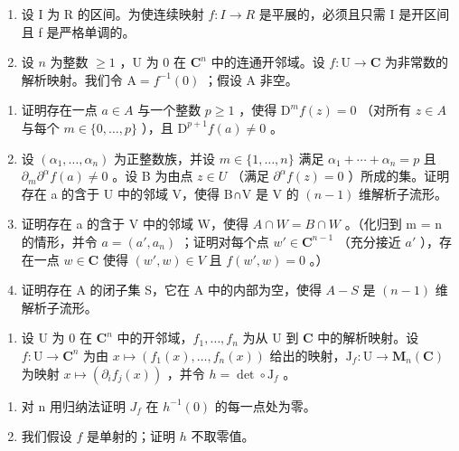 \begin{enumerate}
\def\labelenumi{\arabic{enumi})}
\setcounter{enumi}{2}
\item
  设 I 为 R 的区间。为使连续映射 \(f: I \rightarrow R\) 是平展的，必须且只需 I 是开区间且 f 是严格单调的。
\item
  设 \(n\) 为整数 \(\geqslant 1\) ，U 为 0 在 \(\mathbf{C}^n\) 中的连通开邻域。设 \(f: \mathrm{U} \to \mathbf{C}\) 为非常数的解析映射。我们令 \(\mathrm{A} = f^{-1}(0)\) ；假设 A 非空。
\end{enumerate}

\begin{enumerate}
\def\labelenumi{\alph{enumi})}
\item
  证明存在一点 \(a \in A\) 与一个整数 \(p \geqslant 1\) ，使得 \(\mathrm{D}^{m}f(z) = 0\) （对所有 \(z \in A\) 与每个 \(m \in \{0, \ldots, p\}\) ），且 \(\mathrm{D}^{p+1}f(a) \neq 0\) 。
\item
  设 \((\alpha_{1},\ldots,\alpha_{n})\) 为正整数族，并设 \(m\in\{1,\ldots,n\}\) 满足 \(\alpha_{1}+\cdots+\alpha_{n}=p\) 且 \(\partial_{m}\partial^{\alpha}f(a)\neq0\) 。设 B 为由点 \(z\in U\) （满足 \(\partial^{\alpha}f(z)=0\) ）所成的集。证明存在 a 的含于 U 中的邻域 V，使得 B∩V 是 V 的 \((n-1)\) 维解析子流形。
\item
  证明存在 a 的含于 V 中的邻域 W，使得 \(A \cap W = B \cap W\) 。（化归到 m = n 的情形，并令 \(a = (a', a_n)\) ；证明对每个点 \(w' \in \mathbf{C}^{n-1}\) （充分接近 \(a'\) ），存在一点 \(w \in \mathbf{C}\) 使得 \((w', w) \in V\) 且 \(f(w', w) = 0\) 。）
\item
  证明存在 A 的闭子集 S，它在 A 中的内部为空，使得 \(A - S\) 是 \((n - 1)\) 维解析子流形。
\end{enumerate}

\begin{enumerate}
\def\labelenumi{\arabic{enumi})}
\setcounter{enumi}{4}
\tightlist
\item
  设 U 为 0 在 \(\mathbf{C}^n\) 中的开邻域，\(f_1, \ldots, f_n\) 为从 U 到 \(\mathbf{C}\) 中的解析映射。设 \(f\colon \mathrm{U} \to \mathbf{C}^n\) 为由 \(x \mapsto (f_1(x), \ldots, f_n(x))\) 给出的映射，\(\mathrm{J}_f\colon \mathrm{U} \to \mathbf{M}_n(\mathbf{C})\) 为映射 \(x \mapsto (\partial_i f_j(x))\) ，并令 \(h = \det \circ \mathrm{J}_f\) 。
\end{enumerate}

\begin{enumerate}
\def\labelenumi{\alph{enumi})}
\item
  对 n 用归纳法证明 \(J_{f}\) 在 \(h^{-1}(0)\) 的每一点处为零。
\item
  我们假设 \(f\) 是单射的；证明 \(h\) 不取零值。
\end{enumerate}

